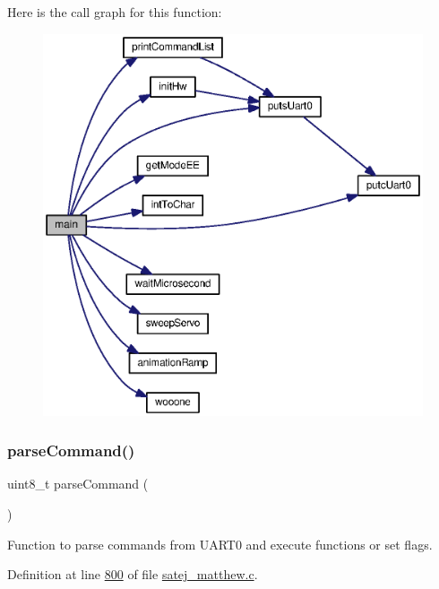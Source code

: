 Here is the call graph for this function\+:
\nopagebreak
\begin{figure}[H]
\begin{center}
\leavevmode
\includegraphics[width=350pt]{satej__matthew_8c_a922afd31fa147cb51a9b28ce18b3e30e_cgraph}
\end{center}
\end{figure}
\mbox{\label{satej__matthew_8c_a784ef656236362513864c6ba3507e22d}} 
\subsubsection{\texorpdfstring{parseCommand()}{parseCommand()}}
{\footnotesize\ttfamily uint8\+\_\+t parse\+Command (\begin{DoxyParamCaption}{ }\end{DoxyParamCaption})}



Function to parse commands from U\+A\+R\+T0 and execute functions or set flags. 



Definition at line \mbox{\hyperlink{satej__matthew_8c_source_l00800}{800}} of file \mbox{\hyperlink{satej__matthew_8c_source}{satej\+\_\+matthew.\+c}}.

